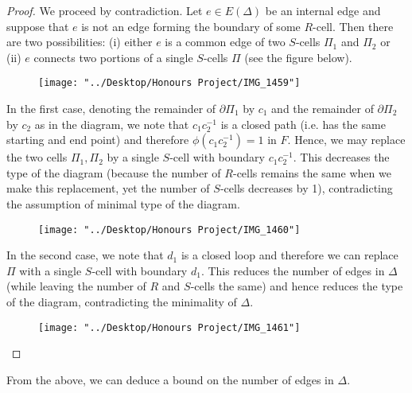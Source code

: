 \documentclass[12pt]{article}
\newcommand{\vs}{\vskip10pt}
\begin{document}
	\begin{proof}
		
		We proceed by contradiction. Let $e \in E(\Delta)$ be an internal edge and suppose that $e$ is not an edge forming the boundary of some $R$-cell. Then there are two possibilities: (i) either $e$ is a common edge of two $S$-cells $\Pi_1$ and $\Pi_2$ or (ii) $e$ connects two portions of a single $S$-cells $\Pi$ (see the figure below). 
		
		
\begin{figure} [h]
	\centering
	\texttt{[image: "../Desktop/Honours Project/IMG\_1459"]}
	\caption{}
	\label{fig:img1459}
\end{figure}

		
		\vs 
		
		In the first case, denoting the remainder of $\partial \Pi_1$ by $c_1$ and the remainder of $\partial \Pi_2$ by $c_2$ as in the diagram, we note that $c_1 c_2^{-1}$ is a closed path (i.e. has the same starting and end point) and therefore $\phi(c_1c_2^{-1}) = 1$ in $F$. Hence, we may replace the two cells $\Pi_1, \Pi_2$ by a single $S$-cell with boundary $c_1 c_2^{-1}$. This decreases the type of the diagram (because the number of $R$-cells remains the same when we make this replacement, yet the number of $S$-cells decreases by 1), contradicting the assumption of minimal type of the diagram. 
		
		\begin{figure} [h]
			\centering
			\texttt{[image: "../Desktop/Honours Project/IMG\_1460"]}
			\caption{}
			\label{fig:img1460}
		\end{figure}
		
		\vs 
		
		In the second case, we note that $d_1$ is a closed loop and therefore we can replace $\Pi$ with a single $S$-cell with boundary $d_1$. This reduces the number of edges in $\Delta$ (while leaving the number of $R$ and $S$-cells the same) and hence reduces the type of the diagram, contradicting the minimality of $\Delta$.
		
\begin{figure} [h]
	\centering
	\texttt{[image: "../Desktop/Honours Project/IMG\_1461"]}
	\caption{}
	\label{fig:img1461}
\end{figure}
		
	\end{proof}

	From the above, we can deduce a bound on the number of edges in $\Delta$.
	
\end{document}
